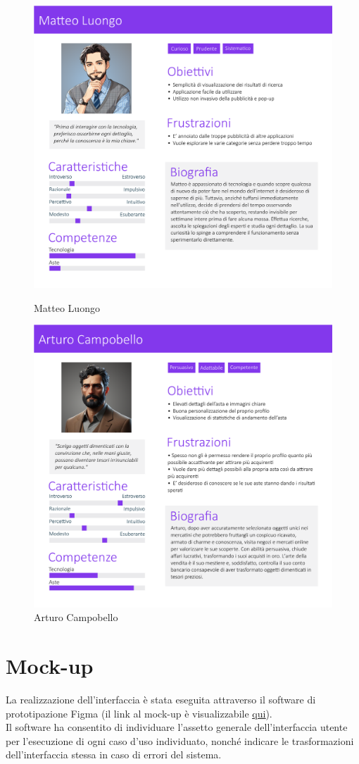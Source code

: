         \begin{figure}[!htb]
           \begin{minipage}{0.48\textwidth}
                \centering
             \includegraphics[width=.7\linewidth]{Immagini/Personas/Matteo Luongo.pdf}
             \caption{Matteo Luongo}\label{Fig:Matteo Luongo}
           \end{minipage}\hfill
           \begin{minipage}{0.48\textwidth}
                \centering
             \includegraphics[width=.7\linewidth]{Immagini/Personas/Arturo Campobello.pdf}
             \caption{Arturo Campobello}\label{Fig:Arturo Campobello}
           \end{minipage}
        \end{figure}
    
    \section{Mock-up}
    La realizzazione dell'interfaccia è stata eseguita attraverso il software di prototipazione Figma (il link al mock-up è visualizzabile \href{https://www.figma.com/file/kieERzm8U3jsHALXk4IjKS/Mockup?type=design&node-id=0%3A1&mode=design&t=CAyNdczd5giYLJ1j-1}{\underline{qui}}). \\
    Il software ha consentito di individuare l'assetto generale dell'interfaccia utente per l'esecuzione di ogni caso d'uso individuato, nonché indicare le trasformazioni dell'interfaccia stessa in caso di errori del sistema.


